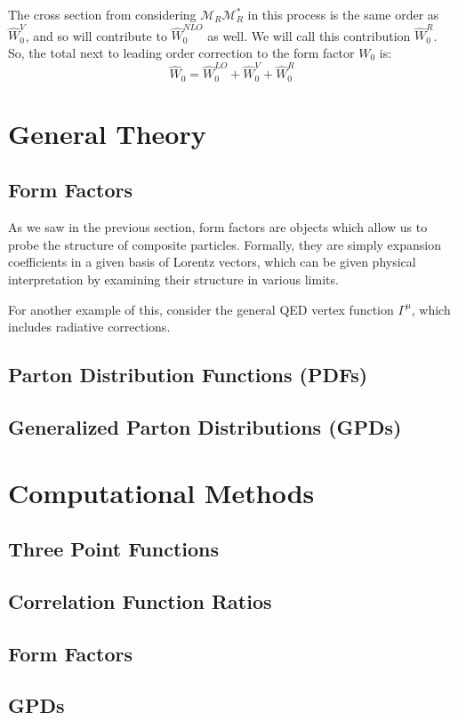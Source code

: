 \documentclass[11pt, oneside]{article}   	%
\theoremstyle{definition}
\begin{document}
The cross section from considering $\mathcal M_R\mathcal M_R^*$ in this process is the same order as $\hat W_0^V$, and so will contribute 
to $\hat W_0^{NLO}$ as well. We will call this contribution $\hat W_0^R$. So, the total next to leading order correction to the form factor $W_0$ is:
\begin{equation}
	\hat W_0 = \hat W_0^{LO} + \hat W_0^V + \hat W_0^R
\end{equation}

\newpage
\section{General Theory}

\subsection{Form Factors}

As we saw in the previous section, form factors are objects which allow us to probe the structure of composite particles. Formally, 
they are simply expansion coefficients in a given basis of Lorentz vectors, which can be given physical interpretation by 
examining their structure in various limits. 

For another example of this, consider the general QED vertex function $\Gamma^\mu$, which includes radiative corrections. 

\subsection{Parton Distribution Functions (PDFs)}

\subsection{Generalized Parton Distributions (GPDs)}

\newpage
\section{Computational Methods}

\subsection{Three Point Functions}

\subsection{Correlation Function Ratios}

\subsection{Form Factors}

\subsection{GPDs}
\end{document}
